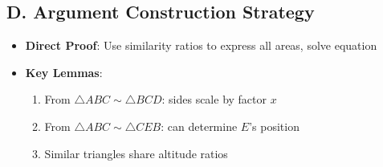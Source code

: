 \documentclass[]{article}
\begin{document}
\begin{strategicbox}
\subsection*{D. Argument Construction Strategy}
\begin{itemize}[leftmargin=*]
    \item \textbf{Direct Proof}: Use similarity ratios to express all areas, solve equation
    \item \textbf{Key Lemmas}:
    \begin{enumerate}
        \item From $\triangle ABC \sim \triangle BCD$: sides scale by factor $x$
        \item From $\triangle ABC \sim \triangle CEB$: can determine $E$'s position
        \item Similar triangles share altitude ratios
    \end{enumerate}
\end{itemize}
\end{strategicbox}
\end{document}
